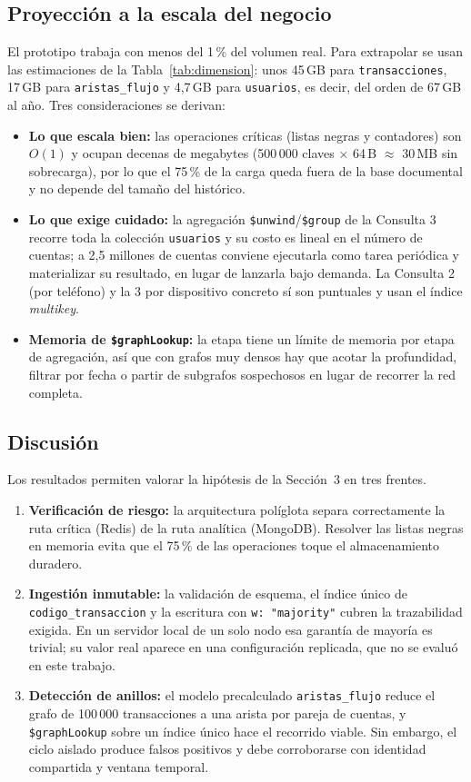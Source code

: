\documentclass[11pt,a4paper]{article}
\begin{document}
	\subsection{Proyección a la escala del negocio}
	El prototipo trabaja con menos del 1\,\% del volumen real. Para extrapolar se usan las estimaciones de la Tabla~\ref{tab:dimension}: unos 45\,GB para \texttt{transacciones}, 17\,GB para \texttt{aristas\_flujo} y 4,7\,GB para \texttt{usuarios}, es decir, del orden de 67\,GB al año. Tres consideraciones se derivan:
	\begin{itemize}[leftmargin=2em]
		\item \textbf{Lo que escala bien:} las operaciones críticas (listas negras y contadores) son $O(1)$ y ocupan decenas de megabytes (500\,000 claves $\times$ 64\,B $\approx$ 30\,MB sin sobrecarga), por lo que el 75\,\% de la carga queda fuera de la base documental y no depende del tamaño del histórico.
		\item \textbf{Lo que exige cuidado:} la agregación \texttt{\$unwind}/\texttt{\$group} de la Consulta 3 recorre toda la colección \texttt{usuarios} y su costo es lineal en el número de cuentas; a 2,5 millones de cuentas conviene ejecutarla como tarea periódica y materializar su resultado, en lugar de lanzarla bajo demanda. La Consulta 2 (por teléfono) y la 3 por dispositivo concreto sí son puntuales y usan el índice \textit{multikey}.
		\item \textbf{Memoria de \texttt{\$graphLookup}:} la etapa tiene un límite de memoria por etapa de agregación, así que con grafos muy densos hay que acotar la profundidad, filtrar por fecha o partir de subgrafos sospechosos en lugar de recorrer la red completa.
	\end{itemize}
	
	\subsection{Discusión}
	Los resultados permiten valorar la hipótesis de la Sección~3 en tres frentes.
	\begin{enumerate}[leftmargin=2em]
		\item \textbf{Verificación de riesgo:} la arquitectura políglota separa correctamente la ruta crítica (Redis) de la ruta analítica (MongoDB). Resolver las listas negras en memoria evita que el 75\,\% de las operaciones toque el almacenamiento duradero.
		\item \textbf{Ingestión inmutable:} la validación de esquema, el índice único de \texttt{codigo\_transaccion} y la escritura con \texttt{w: "majority"} cubren la trazabilidad exigida. En un servidor local de un solo nodo esa garantía de mayoría es trivial; su valor real aparece en una configuración replicada, que no se evaluó en este trabajo.
		\item \textbf{Detección de anillos:} el modelo precalculado \texttt{aristas\_flujo} reduce el grafo de 100\,000 transacciones a una arista por pareja de cuentas, y \texttt{\$graphLookup} sobre un índice único hace el recorrido viable. Sin embargo, el ciclo aislado produce falsos positivos y debe corroborarse con identidad compartida y ventana temporal.
	\end{enumerate}
	
\end{document}
